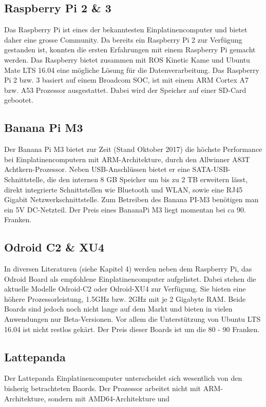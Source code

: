 \subsection{Raspberry Pi 2 \& 3}
\label{subsec:Raspberry}
Das Raspberry Pi ist eines der bekanntesten Einplatinencomputer und bietet daher eine grosse Community. Da bereits ein Raspberry Pi 2 zur Verfügung gestanden ist, konnten die ersten Erfahrungen mit einem Raspberry Pi gemacht werden. Das Raspberry bietet zusammen mit ROS Kinetic Kame und Ubuntu Mate LTS 16.04 eine mögliche Lösung für die Datenverarbeitung. Das Raspberry Pi 2 bzw. 3 basiert auf einem Broadcom \ac{SOC}, ist mit einem ARM Cortex A7 bzw. A53 Prozessor ausgestattet. Dabei wird der Speicher auf einer \ac{SD}-Card  gebootet. 

\subsection{Banana Pi M3}
\label{sec:BananaPi}
Der Banana Pi M3 bietet zur Zeit (Stand Oktober 2017) die höchste Performance bei Einplatinencomputern mit ARM-Architekture, durch den Allwinner A83T Achtkern-Prozessor. Neben USB-Anschlüssen bietet er eine SATA-USB-Schnittstelle, die den internen 8 GB Speicher um bis zu 2 TB erweitern lässt, direkt integrierte Schnittstellen wie Bluetooth und WLAN, sowie eine RJ45 Gigabit Netzwerkschnittstelle. Zum Betreiben des Banana PI-M3 benötigen man ein 5V DC-Netzteil. Der Preis eines BananaPi M3 liegt momentan bei ca 90. Franken.

 
\subsection{Odroid C2 \& XU4} 
\label{Odroid}
In diversen Literaturen (siehe \cite{ROSprojects} Kapitel 4) werden neben dem Raspberry Pi, das Odroid Board als empfohlene Einplatinencomputer aufgelistet. Dabei stehen die aktuelle Modelle Odroid-C2 oder Odroid-XU4 zur Verfügung. Sie bieten eine höhere Prozessorleistung, 1.5GHz bzw. 2GHz mit je 2 Gigabyte \ac{RAM}. Beide Boards sind jedoch noch nicht lange auf dem Markt und bieten in vielen Anwendungen nur Beta-Versionen. Vor allem die Unterstützung von Ubuntu LTS 16.04 ist nicht restlos gekärt. Der Preis dieser Boards ist um die 80 - 90 Franken.

\subsection{Lattepanda} 
\label{Lattepanda}
Der Lattepanda Einplatinencomputer unterscheidet sich wesentlich von den bisherig betrachteten Baords. Der Prozessor arbeitet nicht mit ARM-Architekture, sondern mit AMD64-Architekture und 


